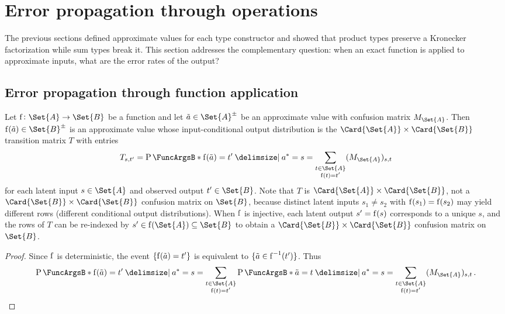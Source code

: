 \documentclass[ ../main.tex]{subfiles}
\begin{document}
\section{Error propagation through operations}
\label{sec:error_prop}

The previous sections defined approximate values for each type constructor and showed that product types preserve a Kronecker factorization while sum types break it.
This section addresses the complementary question: when an exact function is applied to approximate inputs, what are the error rates of the output?

\subsection{Error propagation through function application}

\begin{theorem}
\label{thm:error_prop}
Let $\Fun{f} \colon \Set{A} \to \Set{B}$ be a function and let $\tilde{a} \in \AT{\Set{A}}$ be an approximate value with confusion matrix $M_{\Set{A}}$.
Then $\Fun{f}(\tilde{a}) \in \AT{\Set{B}}$ is an approximate value whose input-conditional output distribution is the $\Card{\Set{A}} \times \Card{\Set{B}}$ transition matrix $T$ with entries
\begin{equation}
\label{eq:error_prop_general}
T_{s, t'} = \Prob{\Fun{f}(\tilde{a}) = t' \Given a^* = s} = \sum_{\substack{t \in \Set{A} \\ \Fun{f}(t) = t'}} (M_{\Set{A}})_{s, t}
\end{equation}
for each latent input $s \in \Set{A}$ and observed output $t' \in \Set{B}$.
Note that $T$ is $\Card{\Set{A}} \times \Card{\Set{B}}$, not a $\Card{\Set{B}} \times \Card{\Set{B}}$ confusion matrix on $\Set{B}$, because distinct latent inputs $s_1 \neq s_2$ with $\Fun{f}(s_1) = \Fun{f}(s_2)$ may yield different rows (different conditional output distributions).
When $\Fun{f}$ is injective, each latent output $s' = \Fun{f}(s)$ corresponds to a unique $s$, and the rows of $T$ can be re-indexed by $s' \in \Fun{f}(\Set{A}) \subseteq \Set{B}$ to obtain a $\Card{\Set{B}} \times \Card{\Set{B}}$ confusion matrix on $\Set{B}$.
\end{theorem}
\begin{proof}
Since $\Fun{f}$ is deterministic, the event $\{\Fun{f}(\tilde{a}) = t'\}$ is equivalent to $\{\tilde{a} \in \Fun{f}^{-1}(t')\}$.
Thus
\begin{equation}
\Prob{\Fun{f}(\tilde{a}) = t' \Given a^* = s}
= \sum_{\substack{t \in \Set{A} \\ \Fun{f}(t) = t'}} \Prob{\tilde{a} = t \Given a^* = s}
= \sum_{\substack{t \in \Set{A} \\ \Fun{f}(t) = t'}} (M_{\Set{A}})_{s, t}\,.
\end{equation}
\end{proof}
\end{document}
